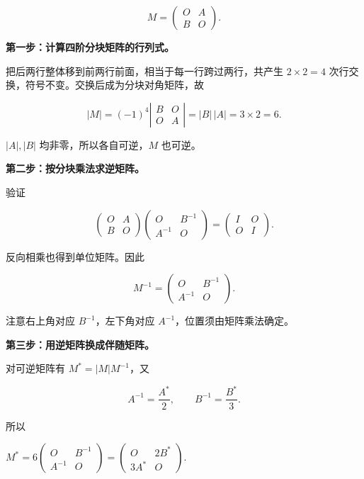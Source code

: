 \documentclass[UTF8,11pt,fontset=windows]{ctexart}
\begin{document}
$$
M=\begin{pmatrix}O&A\\B&O\end{pmatrix}.
$$

\textbf{第一步：计算四阶分块矩阵的行列式。}

把后两行整体移到前两行前面，相当于每一行跨过两行，共产生 $2\times2=4$ 次行交换，符号不变。交换后成为分块对角矩阵，故

$$
|M|=(-1)^4\left|\begin{matrix}B&O\\O&A\end{matrix}\right|
=|B|\,|A|=3\times2=6.
$$

$|A|,|B|$ 均非零，所以各自可逆，$M$ 也可逆。

\textbf{第二步：按分块乘法求逆矩阵。}

验证

$$
\begin{pmatrix}O&A\\B&O\end{pmatrix}
\begin{pmatrix}O&B^{-1}\\A^{-1}&O\end{pmatrix}
=\begin{pmatrix}I&O\\O&I\end{pmatrix}.
$$

反向相乘也得到单位矩阵。因此

$$
M^{-1}=\begin{pmatrix}O&B^{-1}\\A^{-1}&O\end{pmatrix}.
$$

注意右上角对应 $B^{-1}$，左下角对应 $A^{-1}$，位置须由矩阵乘法确定。

\textbf{第三步：用逆矩阵换成伴随矩阵。}

对可逆矩阵有 $M^*=|M|M^{-1}$，又

$$
A^{-1}=\frac{A^*}{2},\qquad B^{-1}=\frac{B^*}{3}.
$$

所以

$
M^*=6\begin{pmatrix}O&B^{-1}\\A^{-1}&O\end{pmatrix}
=\boxed{\begin{pmatrix}O&2B^*\\3A^*&O\end{pmatrix}}.
$
\end{document}
